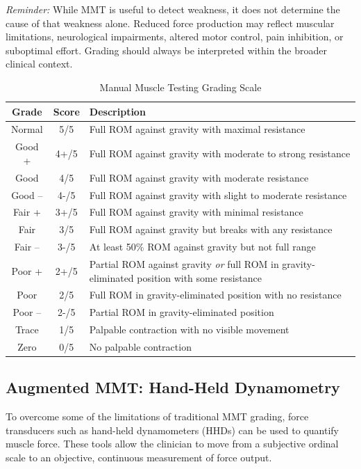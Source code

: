 \medskip
\noindent
\textit{Reminder:} While MMT is useful to detect weakness, it does not determine the cause of that weakness alone. Reduced force production may reflect muscular limitations, neurological impairments, altered motor control, pain inhibition, or suboptimal effort. Grading should always be interpreted within the broader clinical context.

\begin{table}[H]
\centering
\begin{tabular}{|c|c|p{9cm}|}
\hline
\textbf{Grade} & \textbf{Score} & \textbf{Description} \\
\hline
Normal & 5/5 & Full ROM against gravity with maximal resistance \\
\hline
Good + & 4+/5 & Full ROM against gravity with moderate to strong resistance \\
\hline
Good & 4/5 & Full ROM against gravity with moderate resistance \\
\hline
Good – & 4-/5 & Full ROM against gravity with slight to moderate resistance \\
\hline
Fair + & 3+/5 & Full ROM against gravity with minimal resistance \\
\hline
Fair & 3/5 & Full ROM against gravity but breaks with any resistance \\
\hline
Fair – & 3-/5 & At least 50\% ROM against gravity but not full range \\
\hline
Poor + & 2+/5 & Partial ROM against gravity \textit{or} full ROM in gravity-eliminated position with some resistance \\
\hline
Poor & 2/5 & Full ROM in gravity-eliminated position with no resistance \\
\hline
Poor – & 2-/5 & Partial ROM in gravity-eliminated position \\
\hline
Trace & 1/5 & Palpable contraction with no visible movement \\
\hline
Zero & 0/5 & No palpable contraction \\
\hline
\end{tabular}
\caption{Manual Muscle Testing Grading Scale}
\end{table}

\subsection*{Augmented MMT: Hand-Held Dynamometry}

To overcome some of the limitations of traditional MMT grading, force transducers such as hand-held dynamometers (HHDs) can be used to quantify muscle force. These tools allow the clinician to move from a subjective ordinal scale to an objective, continuous measurement of force output.

